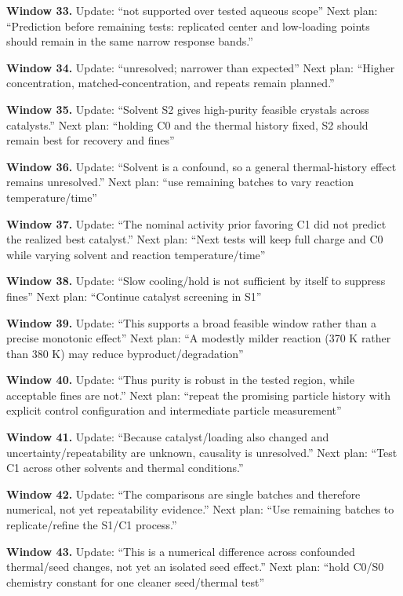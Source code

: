 \documentclass[10pt,a4paper]{article}
\begin{document}
\textbf{Window 33.} Update: ``not supported over tested aqueous scope'' Next plan: ``Prediction before remaining tests: replicated center and low-loading points should remain in the same narrow response bands.''

\textbf{Window 34.} Update: ``unresolved; narrower than expected'' Next plan: ``Higher concentration, matched-concentration, and repeats remain planned.''

\textbf{Window 35.} Update: ``Solvent S2 gives high-purity feasible crystals across catalysts.'' Next plan: ``holding C0 and the thermal history fixed, S2 should remain best for recovery and fines''

\textbf{Window 36.} Update: ``Solvent is a confound, so a general thermal-history effect remains unresolved.'' Next plan: ``use remaining batches to vary reaction temperature/time''

\textbf{Window 37.} Update: ``The nominal activity prior favoring C1 did not predict the realized best catalyst.'' Next plan: ``Next tests will keep full charge and C0 while varying solvent and reaction temperature/time''

\textbf{Window 38.} Update: ``Slow cooling/hold is not sufficient by itself to suppress fines'' Next plan: ``Continue catalyst screening in S1''

\textbf{Window 39.} Update: ``This supports a broad feasible window rather than a precise monotonic effect'' Next plan: ``A modestly milder reaction (370 K rather than 380 K) may reduce byproduct/degradation''

\textbf{Window 40.} Update: ``Thus purity is robust in the tested region, while acceptable fines are not.'' Next plan: ``repeat the promising particle history with explicit control configuration and intermediate particle measurement''

\textbf{Window 41.} Update: ``Because catalyst/loading also changed and uncertainty/repeatability are unknown, causality is unresolved.'' Next plan: ``Test C1 across other solvents and thermal conditions.''

\textbf{Window 42.} Update: ``The comparisons are single batches and therefore numerical, not yet repeatability evidence.'' Next plan: ``Use remaining batches to replicate/refine the S1/C1 process.''

\textbf{Window 43.} Update: ``This is a numerical difference across confounded thermal/seed changes, not yet an isolated seed effect.'' Next plan: ``hold C0/S0 chemistry constant for one cleaner seed/thermal test''
\end{document}
